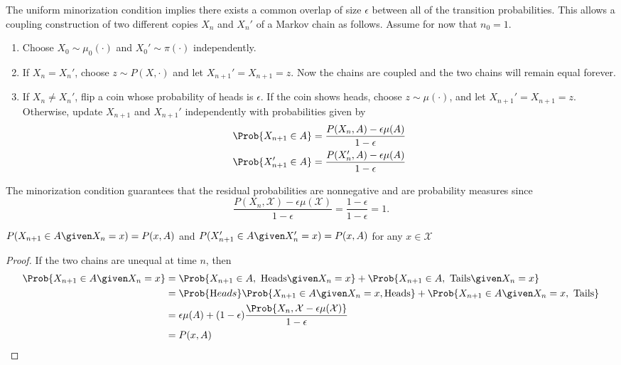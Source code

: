 \documentclass[12pt]{article}
\begin{document}
The uniform minorization condition implies there exists a common overlap
of size \( \epsilon \) between all of the transition probabilities.
This allows a coupling construction of two different copies \( X_n \)
and \( X_n' \) of a Markov chain as follows.  Assume for now that \( n_0
= 1 \).
\begin{enumerate}
    \item
        Choose \( X_0 \sim \mu_0(\cdot) \) and \( X_0' \sim \pi(\cdot) \)
        independently.
    \item
        If \( X_n = X_n' \), choose \( z \sim P(X, \cdot) \) and let \(
        X_{n+1}' = X_{n+1} = z \).  Now the chains are coupled and the
        two chains will remain equal forever.
    \item
        If \( X_n \ne X_n' \), flip a coin whose probability of heads is
        \( \epsilon \).  If the coin shows heads, choose \( z \sim \mu(\cdot)
        \), and let \( X_{n+1}' = X_{n+1} = z \).  Otherwise, update \(
        X_{n+1} \) and \( X_{n+1}' \) independently with probabilities
        given by
        \begin{align*}
            \Prob{X_{n+1} \in A} &= \frac{P(X_n, A) - \epsilon \mu(A)}{1-\epsilon}
            \\
            \Prob{X_{n+1}' \in A} &= \frac{P(X_n', A) - \epsilon \mu(A)}
            {1-\epsilon} \\
        \end{align*}
\end{enumerate}

The minorization condition guarantees that the residual probabilities
are nonnegative and are probability measures since
\[
    \frac{P(X_n, \mathcal{X}) - \epsilon \mu(\mathcal{X})}{1-\epsilon} =
    \frac{1-\epsilon}{1-\epsilon} = 1.
\]

\begin{lemma}
    \( P(X_{n+1} \in A \given X_n = x) = P(x,A) \) and \( P(X_{n+1}' \in
    A \given X_n' = x) = P(x,A) \) for any \( x \in \mathcal{X} \)
\end{lemma}

\begin{proof}
    If the two chains are unequal at time \( n \), then
    \begin{align*}
        \Prob{X_{n+1} \in A \given X_n = x} &= \Prob{X_{n+1} \in A,\text
        { Heads} \given X_n = x} + \Prob{X_{n+1} \in A,\text{ Tails}
        \given X_n = x} \\
        &= \Prob{\text Heads} \Prob{X_{n+1} \in A \given X_n = x, \text{%
        Heads}} + \Prob{X_{n+1} \in A \given X_n = x, \text{ Tails} } \\
        &= \epsilon \mu(A) + (1-\epsilon) \frac{\Prob{X_n, \mathcal{X} -
        \epsilon \mu(\mathcal{X})}}{1-\epsilon} \\
        &= P(x,A)
    \end{align*}
\end{proof}
\end{document}
